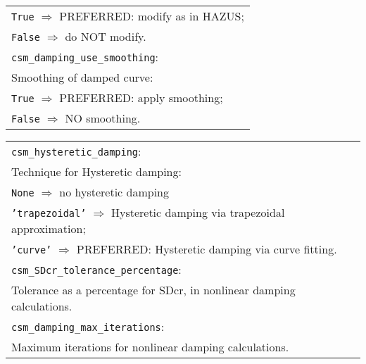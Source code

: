 \documentclass[a4paper, 12pt]{report}
\begin{document}
\begin{tabular}{|p{\textwidth}|}
 \hspace{0.5em} \texttt{True} $\Rightarrow$ \small{PREFERRED}: modify as in HAZUS; \\
 \hspace{0.5em}  \texttt{False} $\Rightarrow$ do NOT modify. \\
\hline \vspace{0.1em} \texttt{csm\_damping\_use\_smoothing}: \\
Smoothing of damped curve: \\
 \hspace{0.5em} \texttt{True} $\Rightarrow$ \small{PREFERRED}: apply smoothing; \\
 \hspace{0.5em} \texttt{False} $\Rightarrow$ NO smoothing.\\
\hline
\end{tabular}

\begin{tabular}{|p{\textwidth}|}
\hline \vspace{0.1em} \texttt{csm\_hysteretic\_damping}: \\
Technique for Hysteretic  damping: \\
 \hspace{0.5em} \texttt{None} $\Rightarrow$ no hysteretic  damping \\
 \hspace{0.5em} \texttt{'trapezoidal'} $\Rightarrow$ Hysteretic  damping via trapezoidal approximation; \\
 \hspace{0.5em} \texttt{'curve'} $\Rightarrow$ \small{PREFERRED}: Hysteretic  damping via curve fitting. \\
\hline \vspace{0.1em} \texttt{csm\_SDcr\_tolerance\_percentage}: \\
Tolerance as a percentage for SDcr, in nonlinear damping calculations.   \\
\hline \vspace{0.1em} \texttt{csm\_damping\_max\_iterations}: \\
 Maximum iterations for nonlinear damping calculations.\\
 \hline
 \end{tabular}
\end{document}
